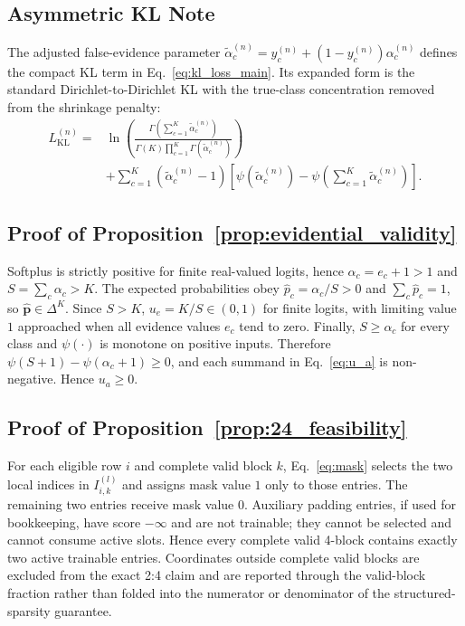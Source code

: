 \documentclass[letterpaper]{article} %
\begin{document}
\subsection{Asymmetric KL Note}
The adjusted false-evidence parameter $\tilde{\alpha}_c^{(n)}=y_c^{(n)}+(1-y_c^{(n)})\alpha_c^{(n)}$ defines the compact KL term in Eq.~\ref{eq:kl_loss_main}. Its expanded form is the standard Dirichlet-to-Dirichlet KL with the true-class concentration removed from the shrinkage penalty:
\begin{equation}\label{eq:kl_loss_expanded}
\begin{aligned}
    L_{\text{KL}}^{(n)}
    ={}& \ln \left(
    \frac{\Gamma\left(\sum_{c=1}^K\tilde{\alpha}_c^{(n)}\right)}
    {\Gamma(K)\prod_{c=1}^K\Gamma(\tilde{\alpha}_c^{(n)})}
    \right)\\
    &+\sum_{c=1}^K(\tilde{\alpha}_c^{(n)}-1)
    \left[
    \psi(\tilde{\alpha}_c^{(n)})
    -\psi\!\left(\sum_{c=1}^K\tilde{\alpha}_c^{(n)}\right)
    \right].
\end{aligned}
\end{equation}

\subsection{Proof of Proposition~\ref{prop:evidential_validity}}
Softplus is strictly positive for finite real-valued logits, hence $\alpha_c=e_c+1>1$ and $S=\sum_c\alpha_c>K$. The expected probabilities obey $\hat{p}_c=\alpha_c/S>0$ and $\sum_c\hat{p}_c=1$, so $\hat{\bm{p}}\in\Delta^K$. Since $S>K$, $u_e=K/S\in(0,1)$ for finite logits, with limiting value $1$ approached when all evidence values $e_c$ tend to zero. Finally, $S\ge\alpha_c$ for every class and $\psi(\cdot)$ is monotone on positive inputs. Therefore $\psi(S+1)-\psi(\alpha_c+1)\ge0$, and each summand in Eq.~\ref{eq:u_a} is non-negative. Hence $u_a\ge0$.

\subsection{Proof of Proposition~\ref{prop:24_feasibility}}
For each eligible row $i$ and complete valid block $k$, Eq.~\ref{eq:mask} selects the two local indices in $I_{i,k}^{(l)}$ and assigns mask value $1$ only to those entries. The remaining two entries receive mask value $0$. Auxiliary padding entries, if used for bookkeeping, have score $-\infty$ and are not trainable; they cannot be selected and cannot consume active slots. Hence every complete valid 4-block contains exactly two active trainable entries. Coordinates outside complete valid blocks are excluded from the exact 2:4 claim and are reported through the valid-block fraction rather than folded into the numerator or denominator of the structured-sparsity guarantee.
\end{document}
